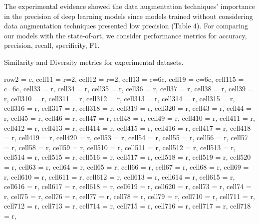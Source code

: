 \documentclass[journal]{IEEEtran}
\begin{document}
The experimental evidence showed the data augmentation techniques' importance in the precision of deep learning models since models trained without considering data augmentation techniques presented low precision (Table 4).
For comparing our models with the state-of-art, we consider performance metrics for accuracy, precision, recall, specificity, F1.

\begin{table}
\caption{Similarity and Diversity metrics for experimental datasets.}
\centering
\begin{adjustbox}{width=\textwidth}
\begin{tblr}{
  row{2} = {c},
  cell{1}{1} = {r=2}{},
  cell{1}{2} = {r=2}{},
  cell{1}{3} = {c=6}{c},
  cell{1}{9} = {c=6}{c},
  cell{1}{15} = {c=6}{c},
  cell{3}{3} = {r},
  cell{3}{4} = {r},
  cell{3}{5} = {r},
  cell{3}{6} = {r},
  cell{3}{7} = {r},
  cell{3}{8} = {r},
  cell{3}{9} = {r},
  cell{3}{10} = {r},
  cell{3}{11} = {r},
  cell{3}{12} = {r},
  cell{3}{13} = {r},
  cell{3}{14} = {r},
  cell{3}{15} = {r},
  cell{3}{16} = {r},
  cell{3}{17} = {r},
  cell{3}{18} = {r},
  cell{3}{19} = {r},
  cell{3}{20} = {r},
  cell{4}{3} = {r},
  cell{4}{4} = {r},
  cell{4}{5} = {r},
  cell{4}{6} = {r},
  cell{4}{7} = {r},
  cell{4}{8} = {r},
  cell{4}{9} = {r},
  cell{4}{10} = {r},
  cell{4}{11} = {r},
  cell{4}{12} = {r},
  cell{4}{13} = {r},
  cell{4}{14} = {r},
  cell{4}{15} = {r},
  cell{4}{16} = {r},
  cell{4}{17} = {r},
  cell{4}{18} = {r},
  cell{4}{19} = {r},
  cell{4}{20} = {r},
  cell{5}{3} = {r},
  cell{5}{4} = {r},
  cell{5}{5} = {r},
  cell{5}{6} = {r},
  cell{5}{7} = {r},
  cell{5}{8} = {r},
  cell{5}{9} = {r},
  cell{5}{10} = {r},
  cell{5}{11} = {r},
  cell{5}{12} = {r},
  cell{5}{13} = {r},
  cell{5}{14} = {r},
  cell{5}{15} = {r},
  cell{5}{16} = {r},
  cell{5}{17} = {r},
  cell{5}{18} = {r},
  cell{5}{19} = {r},
  cell{5}{20} = {r},
  cell{6}{3} = {r},
  cell{6}{4} = {r},
  cell{6}{5} = {r},
  cell{6}{6} = {r},
  cell{6}{7} = {r},
  cell{6}{8} = {r},
  cell{6}{9} = {r},
  cell{6}{10} = {r},
  cell{6}{11} = {r},
  cell{6}{12} = {r},
  cell{6}{13} = {r},
  cell{6}{14} = {r},
  cell{6}{15} = {r},
  cell{6}{16} = {r},
  cell{6}{17} = {r},
  cell{6}{18} = {r},
  cell{6}{19} = {r},
  cell{6}{20} = {r},
  cell{7}{3} = {r},
  cell{7}{4} = {r},
  cell{7}{5} = {r},
  cell{7}{6} = {r},
  cell{7}{7} = {r},
  cell{7}{8} = {r},
  cell{7}{9} = {r},
  cell{7}{10} = {r},
  cell{7}{11} = {r},
  cell{7}{12} = {r},
  cell{7}{13} = {r},
  cell{7}{14} = {r},
  cell{7}{15} = {r},
  cell{7}{16} = {r},
  cell{7}{17} = {r},
  cell{7}{18} = {r},
}
\end{tblr}
\end{adjustbox}
\end{table}
\end{document}
